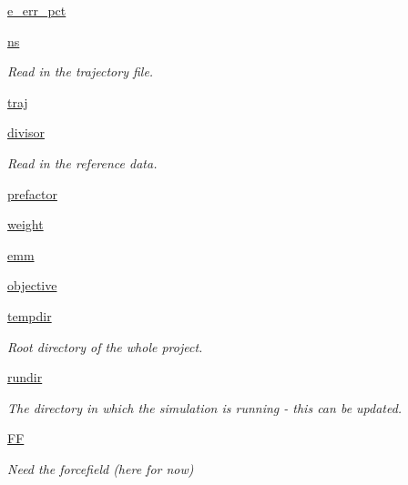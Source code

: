 \begin{DoxyCompactItemize}
\hyperlink{classforcebalance_1_1interaction_1_1Interaction_a7422ae23c535b5f0b265997276cda48f}{e\-\_\-err\-\_\-pct}
\item 
\hyperlink{classforcebalance_1_1interaction_1_1Interaction_ac1f6c5f3016ee6c1e7f847a61326e984}{ns}
\begin{DoxyCompactList}\small\item\em \-Read in the trajectory file. \end{DoxyCompactList}\item 
\hyperlink{classforcebalance_1_1interaction_1_1Interaction_a3deec07ef2fea43d2282c0a2831e3a53}{traj}
\item 
\hyperlink{classforcebalance_1_1interaction_1_1Interaction_a5acc08fd127025be41f07108089c6ad0}{divisor}
\begin{DoxyCompactList}\small\item\em \-Read in the reference data. \end{DoxyCompactList}\item 
\hyperlink{classforcebalance_1_1interaction_1_1Interaction_a3f8576282adfd82b056b20a3d930c022}{prefactor}
\item 
\hyperlink{classforcebalance_1_1interaction_1_1Interaction_a44f014dd322e410a37dd453f99d879ba}{weight}
\item 
\hyperlink{classforcebalance_1_1interaction_1_1Interaction_ae8e2bf3b78d9f44929f7f50dcf90b1db}{emm}
\item 
\hyperlink{classforcebalance_1_1interaction_1_1Interaction_a60e39bdee6c2aea725be0cc1c232a47e}{objective}
\item 
\hyperlink{classforcebalance_1_1target_1_1Target_aede2856573b890cd47054ad36937d6f6}{tempdir}
\begin{DoxyCompactList}\small\item\em \-Root directory of the whole project. \end{DoxyCompactList}\item 
\hyperlink{classforcebalance_1_1target_1_1Target_a1da470037ef61c22dc44beb85cfa01a9}{rundir}
\begin{DoxyCompactList}\small\item\em \-The directory in which the simulation is running -\/ this can be updated. \end{DoxyCompactList}\item 
\hyperlink{classforcebalance_1_1target_1_1Target_a796dc30a19a60c63fb43b088d40a963f}{\-F\-F}
\begin{DoxyCompactList}\small\item\em \-Need the forcefield (here for now) \end{DoxyCompactList}\item 

\end{DoxyCompactItemize}
